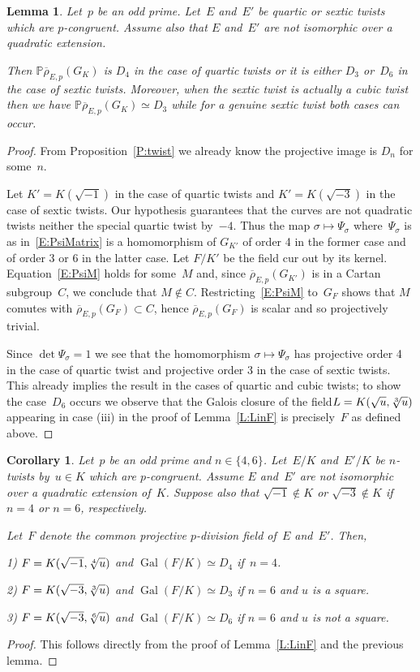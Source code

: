 \documentclass[12pt, reqno]{amsart}
\newcommand{\PP}{\mathbb{P}}
\newcommand{\rhobar}{{\overline{\rho}}}
\DeclareMathOperator{\Gal}{Gal}
\numberwithin{equation}{section}
\newtheorem{lemma}[theorem]{Lemma}
\newtheorem{corollary}[theorem]{Corollary}
\theoremstyle{definition}
\theoremstyle{remark}
\begin{document}
\begin{lemma}
Let~$p$ be an odd prime. Let~$E$ and~$E'$ be quartic or sextic twists which are 
$p$-congruent. Assume also that $E$ and~$E'$
are not isomorphic over a quadratic extension.

Then $\PP\rhobar_{E,p}(G_K)$ is $D_4$ in the case of quartic twists or it is either $D_3$ or~$D_6$ in the case of sextic twists.
Moreover, when the sextic twist is actually a cubic twist then we have $\PP\rhobar_{E,p}(G_K) \simeq D_3$ while for a genuine sextic twist both cases can occur.
\end{lemma}
\begin{proof} From Proposition~\ref{P:twist} we already know the projective image is $D_n$ for some~$n$. 

Let $K'=K(\sqrt{-1})$ in the case of quartic twists and $K'=K(\sqrt{-3})$ in the case of sextic twists. Our hypothesis guarantees that the curves are not quadratic twists neither the special quartic twist by~$-4$. 
Thus the map $\sigma \mapsto \Psi_\sigma$ where~$\Psi_\sigma$ is as in~\eqref{E:PsiMatrix} is a homomorphism of $G_{K'}$ of order 4 in the former case and of order 3 or 6 in the latter case.
Let $F/K'$ be the field cur out by its kernel. Equation~\eqref{E:PsiM} holds for some~$M$ and, since $\rhobar_{E,p}(G_{K'})$ is in a Cartan subgroup~$C$, we conclude that 
$M \not\in C$. Restricting~\eqref{E:PsiM} to~$G_F$ shows that $M$ comutes with $\rhobar_{E,p}(G_F) \subset C$, hence 
$\rhobar_{E,p}(G_F)$ is scalar and so 
projectively trivial.

Since $\det \Psi_\sigma = 1$ we see that the homomorphism $\sigma \mapsto \Psi_\sigma$ has projective order 4 in the case of quartic twist and projective order 3 in the case of sextic twists. This already implies the result in the cases of quartic and cubic twists; to show the case~$D_6$ occurs we observe 
that the Galois closure of the field$L=K(\sqrt{u},\root 3 \of u)$ appearing in 
case (iii) in the proof of Lemma~\ref{L:LinF} is precisely~$F$ as defined above.
\end{proof}

\begin{corollary}
Let~$p$ be an odd prime and $n \in \{4,6 \}$. Let~$E/K$ and~$E'/K$ be $n$-twists by~$u \in K$ which are $p$-congruent. 
Assume $E$ and~$E'$
are not isomorphic over a quadratic extension of~$K$. Suppose also that $\sqrt{-1} \not\in K$ or
$\sqrt{-3} \not\in K$ if $n=4$ or $n=6$, respectively.

Let~$F$ denote the common projective $p$-division field of~$E$ and~$E'$. Then,

1) $F = K(\sqrt{-1}, \root 4 \of u)$ and $\Gal(F/K) \simeq D_4$ if~$n = 4$.

2) $F = K(\sqrt{-3}, \root 3 \of u)$
and $\Gal(F/K) \simeq D_3$ if $n=6$ and $u$ is a square.

3) $F = K(\sqrt{-3}, \root 6 \of u)$
and $\Gal(F/K) \simeq D_6$ if $n=6$ and $u$ is not a square.
\end{corollary}
\begin{proof} This follows directly from the proof of Lemma~\ref{L:LinF} and the previous lemma.
\end{proof}
\end{document}
